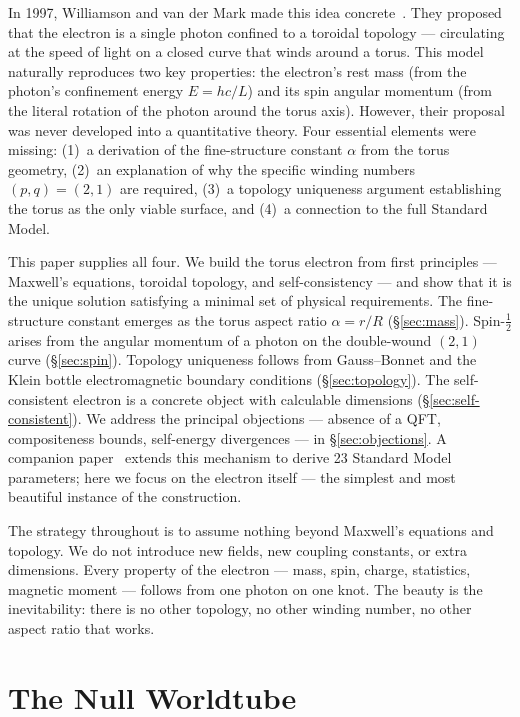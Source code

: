 \documentclass[11pt,a4paper]{article}
\begin{document}
In 1997, Williamson and van der Mark made this idea concrete~\cite{williamson1997}. They proposed that the electron is a single photon confined to a toroidal topology --- circulating at the speed of light on a closed curve that winds around a torus. This model naturally reproduces two key properties: the electron's rest mass (from the photon's confinement energy $E = hc/L$) and its spin angular momentum (from the literal rotation of the photon around the torus axis). However, their proposal was never developed into a quantitative theory. Four essential elements were missing: (1)~a derivation of the fine-structure constant $\alpha$ from the torus geometry, (2)~an explanation of why the specific winding numbers $(p,q) = (2,1)$ are required, (3)~a topology uniqueness argument establishing the torus as the only viable surface, and (4)~a connection to the full Standard Model.

This paper supplies all four. We build the torus electron from first principles --- Maxwell's equations, toroidal topology, and self-consistency --- and show that it is the unique solution satisfying a minimal set of physical requirements. The fine-structure constant emerges as the torus aspect ratio $\alpha = r/R$ (\S\ref{sec:mass}). Spin-$\tfrac{1}{2}$ arises from the angular momentum of a photon on the double-wound $(2,1)$ curve (\S\ref{sec:spin}). Topology uniqueness follows from Gauss--Bonnet and the Klein bottle electromagnetic boundary conditions (\S\ref{sec:topology}). The self-consistent electron is a concrete object with calculable dimensions (\S\ref{sec:self-consistent}). We address the principal objections --- absence of a QFT, compositeness bounds, self-energy divergences --- in \S\ref{sec:objections}. A companion paper~\cite{paper1} extends this mechanism to derive 23 Standard Model parameters; here we focus on the electron itself --- the simplest and most beautiful instance of the construction.

The strategy throughout is to assume nothing beyond Maxwell's equations and topology. We do not introduce new fields, new coupling constants, or extra dimensions. Every property of the electron --- mass, spin, charge, statistics, magnetic moment --- follows from one photon on one knot. The beauty is the inevitability: there is no other topology, no other winding number, no other aspect ratio that works.

\section{The Null Worldtube}
\label{sec:worldtube}
\end{document}
